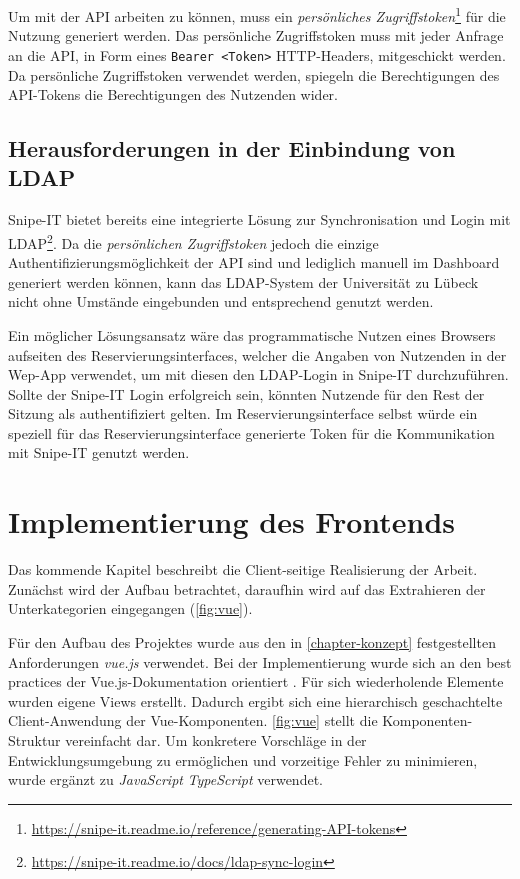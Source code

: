 Um mit der API arbeiten zu können, muss ein \textit{persönliches
  Zugriffstoken}\footnote{\url{https://snipe-it.readme.io/reference/generating-API-tokens}} für die
Nutzung generiert werden. Das persönliche Zugriffstoken muss mit jeder Anfrage an die API, in Form
eines \lstinline{Bearer <Token>} HTTP-Headers, mitgeschickt werden. Da persönliche Zugriffstoken
verwendet werden, spiegeln die Berechtigungen des API-Tokens die Berechtigungen des Nutzenden
wider.

\subsection{Herausforderungen in der Einbindung von LDAP}
\label{subsec:heraus}
Snipe-IT bietet bereits eine integrierte Lösung zur Synchronisation und Login mit
LDAP\footnote{\url{https://snipe-it.readme.io/docs/ldap-sync-login}}. Da die \textit{persönlichen
  Zugriffstoken} jedoch die einzige Authentifizierungsmöglichkeit der API sind und lediglich manuell
im Dashboard generiert werden können, kann das LDAP-System der Universität zu Lübeck nicht ohne
Umstände eingebunden und entsprechend genutzt werden.

Ein möglicher Lösungsansatz wäre das programmatische Nutzen eines Browsers aufseiten des
Reservierungsinterfaces, welcher die Angaben von Nutzenden in der Wep-App verwendet, um mit diesen
den LDAP-Login in Snipe-IT durchzuführen. Sollte der Snipe-IT Login erfolgreich sein, könnten
Nutzende für den Rest der Sitzung als authentifiziert gelten. Im Reservierungsinterface selbst
würde ein speziell für das Reservierungsinterface generierte Token für die Kommunikation mit
Snipe-IT genutzt werden.

\section{Implementierung des Frontends}
\label{subsec:frontend}
Das kommende Kapitel beschreibt die Client-seitige Realisierung der Arbeit. Zunächst wird der Aufbau
betrachtet, daraufhin wird auf das Extrahieren der Unterkategorien eingegangen (\ref{fig:vue}).


Für den Aufbau des Projektes wurde aus den in \ref{chapter-konzept} festgestellten Anforderungen
\textit{vue.js} verwendet. Bei der Implementierung wurde sich an den best practices der
Vue.js-Dokumentation orientiert . Für sich wiederholende Elemente wurden
eigene Views erstellt. Dadurch ergibt sich eine hierarchisch geschachtelte Client-Anwendung der
Vue-Komponenten. \ref{fig:vue} stellt die Komponenten-Struktur vereinfacht dar. Um
konkretere Vorschläge in der Entwicklungsumgebung zu ermöglichen und vorzeitige Fehler zu
minimieren, wurde ergänzt zu \textit{JavaScript} \textit{TypeScript} verwendet.

